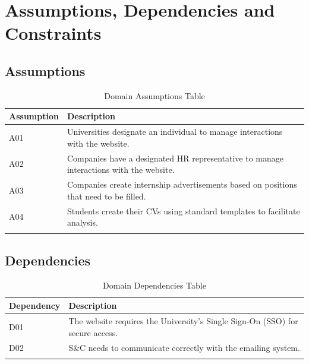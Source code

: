 \section{Assumptions, Dependencies and Constraints}
\label{sec:assumptions_dependencies_and_constraints}%

\subsection{Assumptions}
\label{sub:assumptions}%

\begin{longtable}{|l|p{}|}
      \hline
      \textbf{Assumption} & \textbf{Description}                                                                   \\
      \hline
      A01                 & Universities designate an individual to manage interactions with the website.          \\
      \hline
      A02                 & Companies have a designated HR representative to manage interactions with the website. \\
      \hline
      A03                 & Companies create internship advertisements based on positions that need to be filled.  \\
      \hline
      A04                 & Students create their CVs using standard templates to facilitate analysis.             \\
      \hline

      \caption{Domain Assumptions Table}
      \label{tab:domain_assumptions}
\end{longtable}

\subsection{Dependencies}
\label{sub:dependencies}%

\begin{longtable}{|l|p{}|}
      \hline
      \textbf{Dependency} & \textbf{Description}                                                          \\
      \hline
      D01                 & The website requires the University's Single Sign-On (SSO) for secure access. \\
      \hline
      D02                 & S\&C needs to communicate correctly with the emailing system.                 \\
      \hline

      \caption{Domain Dependencies Table}
      \label{tab:domain_dependencies}
\end{longtable}

